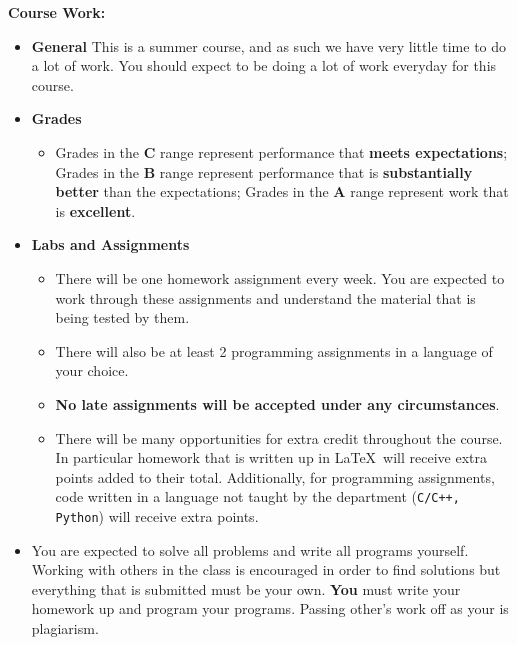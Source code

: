 \documentclass[11pt]{article}
\begin{document}
\textbf {\large Course Work:}
\begin{itemize}
	\item \textbf {General}
          This is a summer course, and as such we have very little time to do a
          lot of work. You should expect to be doing a lot of work everyday for
          this course.
	\item \textbf {Grades}
		\begin{itemize}
			\item Grades in the \textbf{C} range represent performance that 
            \textbf{meets expectations}; Grades in the \textbf{B} range
            represent performance that is \textbf{substantially better} than the
            expectations; Grades in the \textbf{A} range represent work that is 
            \textbf{excellent}.
		\end{itemize}
	\item \textbf {Labs and Assignments}
		\begin{itemize}
          \item There will be one homework assignment every week. You are
          expected to work through these assignments and understand the material
          that is being tested by them.
          \item There will also be at least 2 programming assignments in a
          language of your choice.
          \item \textbf{No late assignments will be accepted under any
          circumstances}.
          \item There will be many opportunities for extra credit throughout the
          course. In particular homework that is written up in \LaTeX\ will
          receive extra points added to their total. Additionally, for
          programming assignments, code written in a language not taught by the
          department (\texttt{C/C++, Python}) will receive extra points.
		\end{itemize}
        \item You are expected to solve all problems and write all programs
        yourself. Working with others in the class is encouraged in order to
        find solutions
        but everything that is submitted must be your own. \textbf{You} must
        write your homework up and program your programs. Passing other's work
        off as your is plagiarism.
\end{itemize}

\end{document}
